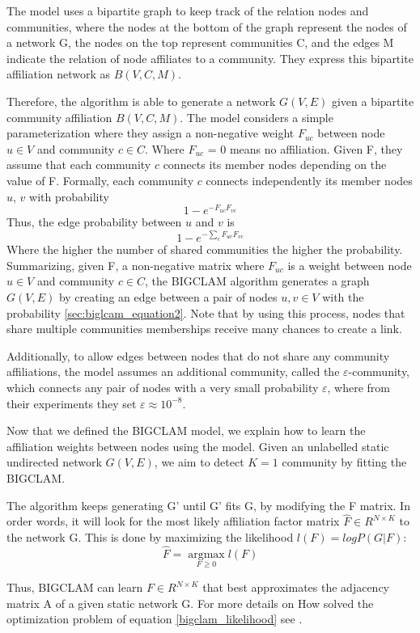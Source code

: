\documentclass[../../thesis.tex]{subfiles}
\begin{document}
The model uses a bipartite graph to keep track of the relation nodes and communities, where the nodes at the bottom of the graph represent the nodes of a network G, the nodes on the top represent communities C, and the edges M indicate the relation of node affiliates to a community. They express this bipartite affiliation network as $B(V, C, M)$.

Therefore, the algorithm is able to generate a network $G(V, E)$ given a bipartite community affiliation $B(V, C, M)$. The model considers a simple parameterization where they assign a non-negative weight $F_{uc}$ between node $u \in  V$ and community $c \in C$. Where $F_{uc}$ = 0 means no affiliation. Given F, they assume that each community $c$ connects its member nodes depending on the value of F. Formally, each community $c$ connects independently its member nodes $u$, $v$ with probability
\begin{equation}
  1 - e^{-F_{uc}F_{vc}}
\end{equation}
Thus, the edge probability between $u$ and $v$ is
\begin{equation}
	1 - e^{-\sum_{c}F_{uc}F_{vc}}
\label{sec:biglcam_equation2}
\end{equation}
Where the higher the number of shared communities the higher the probability. Summarizing, given F, a non-negative matrix where $F_{uc}$ is a weight between node $u \in V$ and community $c \in C$, the BIGCLAM algorithm generates a graph $G(V, E)$ by creating an edge between a pair of nodes $u, v \in V$ with the probability \ref{sec:biglcam_equation2}. Note that by using this process, nodes that share multiple communities memberships receive many chances to create a link.

Additionally, to allow edges between nodes that do not share
any community affiliations, the model assumes an additional community, called the $\varepsilon$-community, which connects any pair of nodes with a very small probability $\varepsilon$, where from their experiments they set $\varepsilon \approx 10^{-8}$.

Now that we defined the BIGCLAM model, we explain how to learn the affiliation weights between nodes using the model. Given an unlabelled static undirected network $G(V, E)$, we aim to detect $K=1$ community by fitting the BIGCLAM. 

The algorithm keeps generating G' until G' fits G, by modifying the F matrix. In order words, it will look for the most likely affiliation factor matrix $\hat{F} \in R^{N\times K}$ to the network G. This is done by maximizing the likelihood $l(F) = log P(G|F)$:
\begin{equation}
\hat{F}  = \operatorname*{argmax}_{F\geq0} l(F)
\label{bigclam_likelihood}
\end{equation}

Thus, BIGCLAM can learn $F \in R^{N\times K}$ that best approximates the adjacency matrix A of a given static network G. For more details on How \citeauthor{yang2013overlapping} solved the optimization problem of equation \ref{bigclam_likelihood} see \cite{yang2013overlapping}.
\end{document}
